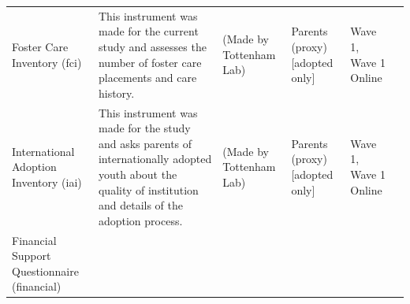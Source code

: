 \documentclass[
]{book}
\begin{document}
\begin{longtable}[]{@{}llllll@{}}
\begin{minipage}[t]{0.18\columnwidth}\raggedright
Foster Care Inventory (fci)\strut
\end{minipage} & \begin{minipage}[t]{0.18\columnwidth}\raggedright
This instrument was made for the current study and assesses the number of foster care placements and care history.\strut
\end{minipage} & \begin{minipage}[t]{0.15\columnwidth}\raggedright
(Made by Tottenham Lab)\strut
\end{minipage} & \begin{minipage}[t]{0.16\columnwidth}\raggedright
Parents (proxy){[}adopted only{]}\strut
\end{minipage} & \begin{minipage}[t]{0.06\columnwidth}\raggedright
Wave 1, Wave 1 Online\strut
\end{minipage} & \begin{minipage}[t]{0.10\columnwidth}\raggedright
\strut
\end{minipage}\tabularnewline
\begin{minipage}[t]{0.18\columnwidth}\raggedright
International Adoption Inventory (iai)\strut
\end{minipage} & \begin{minipage}[t]{0.18\columnwidth}\raggedright
This instrument was made for the study and asks parents of internationally adopted youth about the quality of institution and details of the adoption process.\strut
\end{minipage} & \begin{minipage}[t]{0.15\columnwidth}\raggedright
(Made by Tottenham Lab)\strut
\end{minipage} & \begin{minipage}[t]{0.16\columnwidth}\raggedright
Parents (proxy){[}adopted only{]}\strut
\end{minipage} & \begin{minipage}[t]{0.06\columnwidth}\raggedright
Wave 1, Wave 1 Online\strut
\end{minipage} & \begin{minipage}[t]{0.10\columnwidth}\raggedright
\strut
\end{minipage}\tabularnewline
\begin{minipage}[t]{0.18\columnwidth}\raggedright
Financial Support Questionnaire (financial)\strut
\end{minipage} & \begin{minipage}[t]{0.18\columnwidth}\raggedright

\end{minipage}
\end{longtable}
\end{document}
